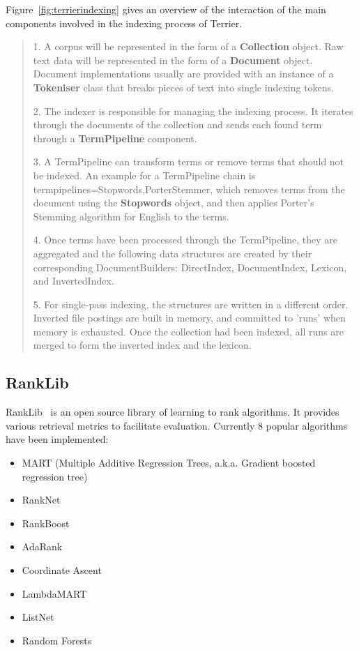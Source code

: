Figure~\ref{fig:terrierindexing} gives an overview of the interaction of the main components involved in the indexing process of Terrier.

\begin{quotation}
 \item 1. A corpus will be represented in the form of a \textbf{Collection} object. Raw text data will be represented in the form of a \textbf{Document} object. 
 Document implementations usually are provided with an instance of a \textbf{Tokeniser} class that breaks pieces of text into single indexing tokens.
 \item 2. The indexer is responsible for managing the indexing process. It iterates through the documents of the collection and sends each found 
 term through a \textbf{TermPipeline} component.
 \item 3. A TermPipeline can transform terms or remove terms that should not be indexed. An example for a TermPipeline chain is 
 termpipelines=Stopwords,PorterStemmer, which removes terms from the document using the \textbf{Stopwords} object, and then applies Porter's Stemming algorithm 
 for English to the terms.
 \item 4. Once terms have been processed through the TermPipeline, they are aggregated and the following data structures are created by their corresponding 
 DocumentBuilders: DirectIndex, DocumentIndex, Lexicon, and InvertedIndex.
 \item 5. For single-pass indexing, the structures are written in a different order. Inverted file postings are built in memory, and committed to 'runs' 
 when memory is exhausted. Once the collection had been indexed, all runs are merged to form the inverted index and the lexicon.
\end{quotation}

\subsection{RankLib}\label{section:rankLib}
RankLib~\cite{ranklib} is an open source library of learning to rank algorithms. It provides various retrieval metrics to facilitate evaluation.
Currently 8 popular algorithms have been implemented:
\begin{itemize}
 \item MART (Multiple Additive Regression Trees, a.k.a. Gradient boosted regression tree)
 \item RankNet
 \item RankBoost
 \item AdaRank
 \item Coordinate Ascent
 \item LambdaMART
 \item ListNet
 \item Random Forests
\end{itemize}

